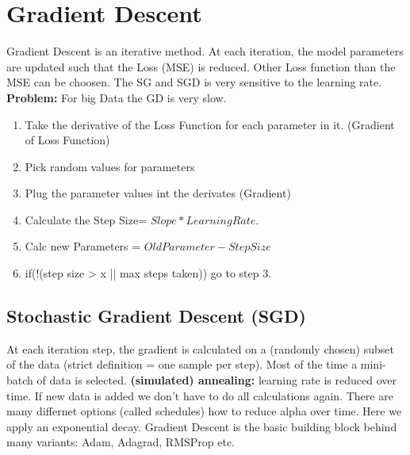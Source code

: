 \section{Gradient Descent}
Gradient Descent is an iterative method. At each iteration, the model parameters are updated such that the Loss (MSE) is reduced. Other Loss function than the MSE can be choosen. The SG and SGD is very sensitive to the learning rate. \textbf{Problem:} For big Data the GD is very slow.
\begin{enumerate}
  \itemsep -0.5em
  \item Take the derivative of the Loss Function for each parameter in it. (Gradient of Loss Function)
  \item Pick random values for parameters
  \item Plug the parameter values int the derivates (Gradient)
  \item Calculate the Step Size= $Slope * Learning Rate$.
  \item Calc new Parameters = $Old Parameter - Step Size$
  \item if(!(step size > x || max steps taken)) go to step 3.
\end{enumerate}

\subsection{Stochastic Gradient Descent (SGD)}
At each iteration step, the gradient is calculated on a (randomly chosen) subset of the data (strict definition = one sample per step). Most of the time a mini-batch of data is selected. \textbf{(simulated) annealing:} learning rate is reduced over time. If new data is added we don't have to do all calculations again. There are many differnet options (called schedules) how to reduce alpha over time. Here we apply an exponential decay. Gradient Descent is the basic building block behind many variants: Adam, Adagrad, RMSProp etc.
